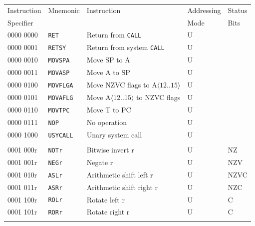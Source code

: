 \documentclass[10pt,fleqn]{book}
\begin{document}
\newpage


\begin{tabular}{ l l l l l }
\toprule
Instruction & Mnemonic       & Instruction                                 & Addressing    & Status\\
Specifier   &                &                                             & Mode          & Bits\\
\midrule

0000 0000   & \verb|RET|     & Return from \verb|CALL|                     & U \\
0000 0001   & \verb|RETSY|   & Return from system \verb|CALL|              & U \\
0000 0010   & \verb|MOVSPA|  & Move SP to A                                & U \\
0000 0011   & \verb|MOVASP|  & Move A to SP                                & U \\  
0000 0100   & \verb|MOVFLGA| & Move NZVC flags to A$\langle12..15\rangle$  & U \\
0000 0101   & \verb|MOVAFLG| & Move A$\langle12..15\rangle$ to NZVC flags  & U \\
0000 0110   & \verb|MOVTPC|  & Move T to PC                                & U \\
0000 0111   & \verb|NOP|     & No operation                                & U \\
0000 1000   & \verb|USYCALL| & Unary system call                           & U \\
 \\
0001 000r   & \verb|NOTr|    & Bitwise invert r                            & U                    & NZ \\
0001 001r   & \verb|NEGr|    & Negate r                                    & U                    & NZV \\
0001 010r   & \verb|ASLr|    & Arithmetic shift left r                     & U                    & NZVC \\
0001 011r   & \verb|ASRr|    & Arithmetic shift right r                    & U                    & NZC \\
0001 100r   & \verb|ROLr|    & Rotate left r                               & U                    & C \\
0001 101r   & \verb|RORr|    & Rotate right r                              & U                    & C \\
 \\

\end{tabular}
\end{document}
